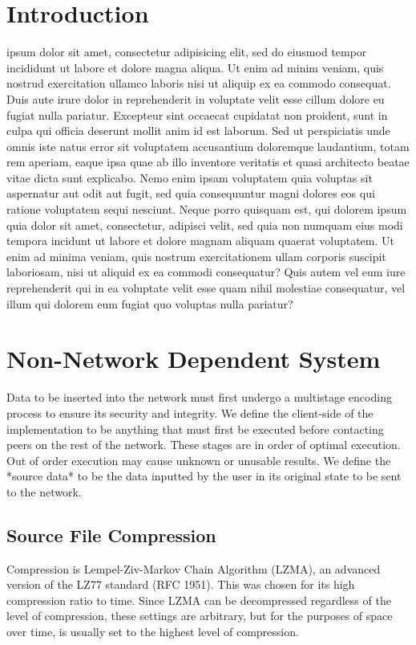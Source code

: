 \documentclass[journal]{IEEEtran}
\begin{document}
\section{Introduction}
 ipsum dolor sit amet, consectetur adipisicing elit, sed do eiusmod tempor incididunt ut labore et dolore magna aliqua. Ut enim ad minim veniam, quis nostrud exercitation ullamco laboris nisi ut aliquip ex ea commodo consequat. Duis aute irure dolor in reprehenderit in voluptate velit esse cillum dolore eu fugiat nulla pariatur. Excepteur sint occaecat cupidatat non proident, sunt in culpa qui officia deserunt mollit anim id est laborum. Sed ut perspiciatis unde omnis iste natus error sit voluptatem accusantium doloremque laudantium, totam rem aperiam, eaque ipsa quae ab illo inventore veritatis et quasi architecto beatae vitae dicta sunt explicabo. Nemo enim ipsam voluptatem quia voluptas sit aspernatur aut odit aut fugit, sed quia consequuntur magni dolores eos qui ratione voluptatem sequi nesciunt. Neque porro quisquam est, qui dolorem ipsum quia dolor sit amet, consectetur, adipisci velit, sed quia non numquam eius modi tempora incidunt ut labore et dolore magnam aliquam quaerat voluptatem. Ut enim ad minima veniam, quis nostrum exercitationem ullam corporis suscipit laboriosam, nisi ut aliquid ex ea commodi consequatur? Quis autem vel eum iure reprehenderit qui in ea voluptate velit esse quam nihil molestiae consequatur, vel illum qui dolorem eum fugiat quo voluptas nulla pariatur?


\section{Non-Network Dependent System}
Data to be inserted into the network must first undergo a multistage encoding process to ensure its security and integrity. We define the client-side of the implementation to be anything that must first be executed before contacting peers on the rest of the network. These stages are in order of optimal execution. Out of order execution may cause unknown or unusable results. We define the *source data* to be the data inputted by the user in its original state to be sent to the network.

\subsection{Source File Compression}
Compression is Lempel-Ziv-Markov Chain Algorithm (LZMA), an advanced version of the LZ77 standard (RFC 1951). This was chosen for its high compression ratio to time. Since LZMA can be decompressed regardless of the level of compression, these settings are arbitrary, but for the purposes of space over time, is usually set to the highest level of compression.
\end{document}
